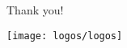 \documentclass[
  10pt,
  aspectratio=169,
  english,
]{beamer}
\begin{document}
\begin{frame}
  \centering
  \vspace{9em}
  \huge{Thank you!}

  \vspace{3em}
  \texttt{[image: logos/logos]}
\end{frame}

\end{document}
